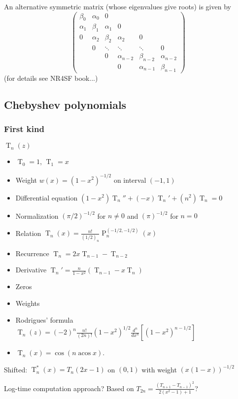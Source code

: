 \documentclass[10pt,dvipdfmx,letterpaper,twoside]{article}
\DeclareMathOperator{\acos}{acos}
\let\O=\operatorname
\let\al=\alpha
\begin{document}
An alternative symmetric matrix (whose eigenvalues give roots) is given by
\[\begin{pmatrix}
\beta_0 & \al_0 &   0 \\
\al_1 & \beta_1 & \al_1 &  0 \\
  0 & \al_2 & \beta_2 & \al_2 &  0 \\
    &  0  & \ddots & \ddots & \ddots & 0\\
    &     &   0 & \al_{n-2} & \beta_{n-2} & \al_{n-2} \\
    &     &     &       0 & \al_{n-1} & \beta_{n-1}
\end{pmatrix}\]
(for details see NR4SF book...)

\subsection{Chebyshev polynomials}

\subsubsection{First kind}
$\O{T}_n(z)$
\begin{itemize}
\item $\O{T}_0 = 1$, $\O{T}_1 = x$
\item Weight $w(x) = (1-x^2)^{-1/2}$ on interval $(-1,1)$
\item Differential equation $\left(1-x^2\right) \O{T}_n'' + \left(-x\right) \O{T}_n' + \left(n^2 \right) \O{T}_n = 0$
\item Normalization $(\pi/2)^{-1/2}$ for $n\neq0$ and $(\pi)^{-1/2}$ for $n=0$
\item Relation $\O{T}_n(x) = \frac{n!}{(1/2)_n} \O{P}_n^{(-1/2, -1/2)}(x)$
\item Recurrence $\O{T}_n = 2 x \O{T}_{n-1} - \O{T}_{n-2}$
\item Derivative $\O{T}_n' = \frac{n}{1-x^2}\left( \O{T}_{n-1} - x \O{T}_{n} \right)$
\item Zeros
\item Weights
\item Rodrigues' formula $\O{T}_n(z) = (-2)^n \frac{n!}{(2n)!} (1-x^2)^{1/2} \frac{d^n}{dx^n}\left[ (1-x^2)^{n-1/2} \right]$
\item $\O{T}_n(x) = \cos(n \acos x)$.
\end{itemize}
Shifted: $\O{T}^*_n(x) = T_n(2x-1)$ on $(0,1)$ with weight $(x(1-x))^{-1/2}$

Log-time computation approach? Based on $T_{2n} = \frac{(T_{n+1}-T_{n-1})^2}{2(x^2-1)+1}$?
\end{document}
